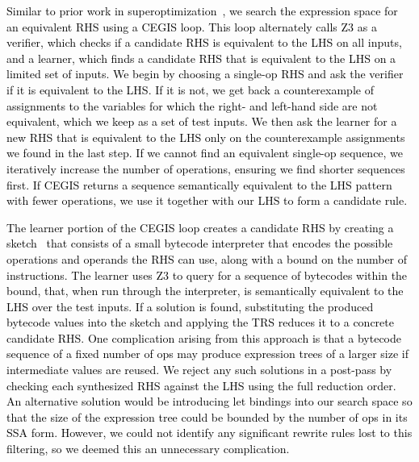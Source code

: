 \documentclass[acmsmall,review]{acmart}\settopmatter{printfolios=true,printccs=false,printacmref=false}
\newcommand{\modified}[1]{\textcolor{black}{{#1}}}
\begin{document}
\modified{Similar to prior work in superoptimization~\cite{regehr2018superoptimization, mangpo2016superoptimization},
we search the expression space for an equivalent RHS using a CEGIS loop. This loop alternately calls Z3 as a
verifier, which checks if a candidate RHS is equivalent to the LHS on all inputs, 
and a learner, which finds a candidate RHS that is equivalent to the LHS on
a limited set of inputs.
We begin by choosing a single-op
RHS and ask the verifier if it is equivalent to the LHS. If it is not, we get back 
a counterexample of assignments to the variables for which the right- and left-hand side are 
not equivalent, which we keep as a set of test inputs. 
We then ask the learner for a new RHS that is equivalent to the LHS 
only on the counterexample assignments we found in the last step. 
If we cannot find an equivalent single-op sequence,
we iteratively increase the number of operations, ensuring we find shorter sequences
first.  If CEGIS returns a sequence semantically equivalent to the LHS pattern with fewer
operations, we use it together with our LHS to form a candidate rule.}

\modified{ The learner portion of the CEGIS loop creates a candidate RHS
  by creating a sketch~\cite{DBLP:conf/aplas/Solar-Lezama09, torlak2014lightweight}
  that consists of a small bytecode interpreter that encodes the possible
  operations and operands the RHS can use, along with a bound on the number of instructions.
  The learner uses Z3 to query for a sequence of bytecodes within the bound, that, when
  run through the interpreter, is semantically
  equivalent to the LHS over the test inputs. If a solution is found,
  substituting the produced bytecode values into the sketch
  and applying the TRS reduces it to a concrete candidate RHS. One
  complication arising from this approach is that a bytecode sequence
  of a fixed number of ops may produce expression trees of a larger
  size if intermediate values are reused. We reject any such solutions
  in a post-pass by checking each synthesized RHS against the LHS
  using the full reduction order. An alternative solution would be
  introducing let bindings into our search space so that the size of
  the expression tree could be bounded by the number of ops in its SSA
  form. However, we could not identify any significant rewrite rules
  lost to this filtering, so we deemed this an unnecessary
  complication. }
\end{document}
